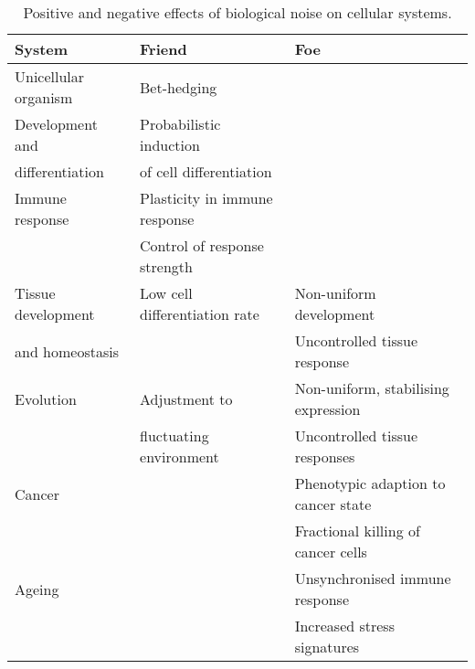 \begin{table}[hb	]
\centering
\caption{Positive and negative effects of biological noise on cellular systems.}
\label{table:effects_noise}
\begin{tabular}{l l l}
\toprule
\toprule
\textbf{System} & \textbf{Friend} & \textbf{Foe} \\ 
\midrule
\midrule
Unicellular organism & Bet-hedging & \\
\midrule
Development and & Probabilistic induction  & \\
differentiation & of cell differentiation & \\
\midrule
Immune response & Plasticity in immune response & \\
 & Control of response strength &   \\
\midrule
Tissue development  & Low cell differentiation rate & Non-uniform development \\ 
and homeostasis &  & Uncontrolled tissue response \\
\midrule
Evolution & Adjustment to  & Non-uniform, stabilising expression \\ 
& fluctuating environment & Uncontrolled tissue responses \\
\midrule
Cancer &  & Phenotypic adaption to cancer state \\
& & Fractional killing of cancer cells \\
\midrule
Ageing &  & Unsynchronised immune response \\
& & Increased stress signatures \\ 
\bottomrule
\bottomrule
\end{tabular}
\end{table}
